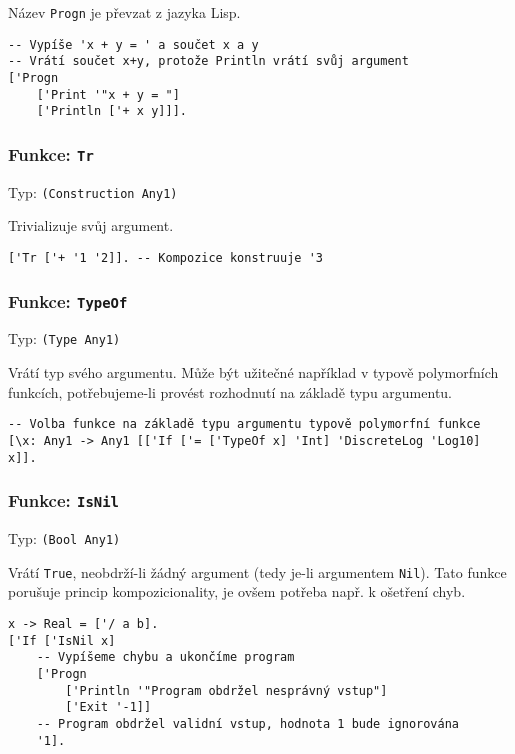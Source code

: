 Název \lstinline{Progn} je převzat z jazyka Lisp.

\begin{lstlisting}[caption={Ukázka využití Progn}]
-- Vypíše 'x + y = ' a součet x a y
-- Vrátí součet x+y, protože Println vrátí svůj argument
['Progn
    ['Print '"x + y = "]
    ['Println ['+ x y]]].
\end{lstlisting}

\subsubsection*{Funkce: \lstinline{Tr}}
Typ: \lstinline{(Construction Any1)}

Trivializuje svůj argument.

\begin{lstlisting}[caption={Ukázka využití Tr}]
['Tr ['+ '1 '2]]. -- Kompozice konstruuje '3
\end{lstlisting}

\subsubsection*{Funkce: \lstinline{TypeOf}}
Typ: \lstinline{(Type Any1)}

Vrátí typ svého argumentu. Může být užitečné například v typově polymorfních funkcích,
potřebujeme-li provést rozhodnutí na základě typu argumentu.

\begin{lstlisting}[caption={Ukázka využití TypeOf}]
-- Volba funkce na základě typu argumentu typově polymorfní funkce
[\x: Any1 -> Any1 [['If ['= ['TypeOf x] 'Int] 'DiscreteLog 'Log10] x]].
\end{lstlisting}

\subsubsection*{Funkce: \lstinline{IsNil}}
Typ: \lstinline{(Bool Any1)}

Vrátí \lstinline{True}, neobdrží-li žádný argument (tedy je-li argumentem \lstinline{Nil}). Tato
funkce porušuje princip kompozicionality, je ovšem potřeba např. k ošetření chyb.

\begin{lstlisting}[caption={Ukázka využití IsNil}]
x -> Real = ['/ a b].
['If ['IsNil x]
    -- Vypíšeme chybu a ukončíme program
    ['Progn
        ['Println '"Program obdržel nesprávný vstup"]
        ['Exit '-1]]
    -- Program obdržel validní vstup, hodnota 1 bude ignorována
    '1].
\end{lstlisting}

